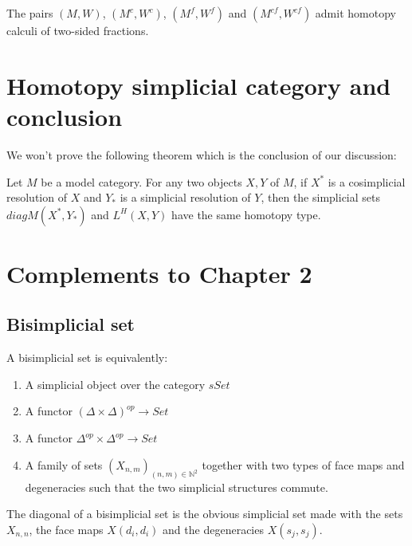 \begin{prop}
The pairs $(M,W)$, $(M^{c},W^{c})$, $(M^{f},W^{f})$ and $(M^{cf},W^{cf})$ admit homotopy calculi of two-sided fractions.
\end{prop}

\section{Homotopy simplicial category and conclusion}

We won't prove the following theorem which is the conclusion of our discussion:
\begin{thm}
Let $M$ be a model category. For any two objects $X,Y$ of $M$, if $X^*$ is a cosimplicial resolution of $X$ and $Y_*$ is a simplicial resolution of $Y$, then the simplicial sets $diag M(X^*,Y_*)$ and $L^H(X,Y)$ have the same homotopy type.
\end{thm}

\section{Complements to Chapter 2}

\subsection{Bisimplicial set}

\begin{defin}
A bisimplicial set is equivalently:
\begin{enumerate}
\item A simplicial object over the category $sSet$
\item A functor $(\Delta \times \Delta)^{op} \rightarrow Set$
\item A functor $\Delta^{op} \times \Delta^{op} \rightarrow Set$
\item A family of sets $(X_{n,m})_{(n,m) \in \mathbb{N}^2}$ together with two types of face maps and degeneracies such that the two simplicial structures commute.
\end{enumerate}
\end{defin}


The diagonal of a bisimplicial set is the obvious simplicial set made with the sets $X_{n,n}$, the face maps $X(d_i,d_i)$ and the degeneracies $X(s_j,s_j).$

